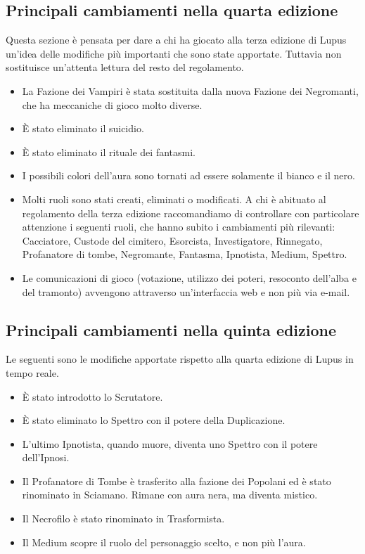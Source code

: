\documentclass[a4paper,10pt]{article}
\begin{document}
\subsection{Principali cambiamenti nella quarta edizione}

Questa sezione è pensata per dare a chi ha giocato alla terza edizione di Lupus
un'idea delle modifiche più importanti che sono state apportate. Tuttavia non
sostituisce un'attenta lettura del resto del regolamento.

\begin{itemize}
 \item La Fazione dei Vampiri è stata sostituita dalla nuova Fazione dei
Negromanti, che ha meccaniche di gioco molto diverse.
 \item È stato eliminato il suicidio.
 \item È stato eliminato il rituale dei fantasmi.
 \item I possibili colori dell'aura sono tornati ad essere solamente il bianco e
il nero.
 \item Molti ruoli sono stati creati, eliminati o modificati. A chi è abituato
al regolamento della terza edizione raccomandiamo di controllare con particolare
attenzione i seguenti ruoli, che hanno subito i cambiamenti più rilevanti:
Cacciatore, Custode del cimitero, Esorcista, Investigatore, Rinnegato, Profanatore di tombe, Negromante, Fantasma, Ipnotista, Medium, Spettro.
 \item Le comunicazioni di gioco (votazione, utilizzo dei poteri, resoconto
dell'alba e del tramonto) avvengono attraverso un'interfaccia web e non più via
e-mail.
\end{itemize}

\subsection{Principali cambiamenti nella quinta edizione}

Le seguenti sono le modifiche apportate rispetto alla quarta edizione di Lupus in tempo reale.

\begin{itemize}
\item È stato introdotto lo Scrutatore.
\item È stato eliminato lo Spettro con il potere della Duplicazione.
\item L'ultimo Ipnotista, quando muore, diventa uno Spettro con il potere dell'Ipnosi.
\item Il Profanatore di Tombe è trasferito alla fazione dei
  Popolani ed è stato rinominato in Sciamano. 
  Rimane con aura nera, ma diventa mistico.
\item Il Necrofilo è stato rinominato in Trasformista.
\item Il Medium scopre il ruolo del personaggio scelto, e non più l'aura.
\end{itemize}
\end{document}
